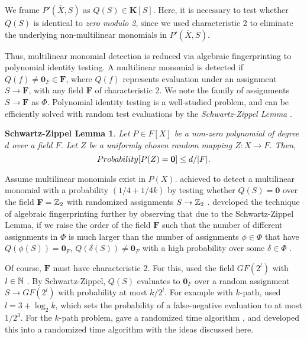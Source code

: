 \begin{problem}
\end{problem}

We frame $P'(\overbar{X}, S)$ as $Q(S) \in \mathbf{K}[S]$. 
Here, it is necessary to test whether $Q(S)$ is identical to \emph{zero modulo 2}, 
since we used characteristic 2 to eliminate 
the underlying non-multilinear monomials in $P'(\overbar{X}, S)$.

Thus, multilinear monomial detection is reduced via algebraic fingerprinting 
to polynomial identity testing. A multilinear monomial is detected if 
$Q(f) \neq \mathbf{0}_F \in \mathbf{F}$, where $Q(f)$ 
represents evaluation under an assignment $S \to \mathbf{F}$, 
with any field $\mathbf{F}$ of characteristic 2. 
We note the family of assignments $S \to \mathbf{F}$ as $\Phi$. 
Polynomial identity testing is a well-studied problem, and can be efficiently 
solved with random test evaluations by the \emph{Schwartz-Zippel Lemma} \cite{Saxena09}.

\newtheorem*{lemmaSZ}{Schwartz-Zippel Lemma}
\begin{lemmaSZ}
  Let $P \in F[X]$ be a non-zero polynomial of degree $d$ over a field $F$. 
  Let $Z$ be a uniformly chosen random mapping $Z \colon X \to F$. Then, 
  \[
    Probability[P(Z) = \mathbf{0}] \leq d/{{\left\vert F\right\vert}}.  
  \]
\end{lemmaSZ}

Assume multilinear monomials exist in $P(X)$. 
\citeauthor{Koutis08} achieved to detect a multilinear monomial 
with a probability $(1/4 + 1/{4k})$ by testing whether 
$Q(S) = \mathbf{0}$ over the field $\mathbf{F} = \mathbb Z_2$  
with randomized assignments $S \to \mathbb Z_2$ \cite{Koutis08}. 
\citeauthor{Williams09} developed the technique of algebraic fingerprinting 
further by observing that due to the Schwartz-Zippel Lemma, %
if we raise the order of the field $\mathbf{F}$ 
such that the number of different assignments in $\Phi$ is much larger than 
the number of assignments $\phi \in \Phi$ that have $Q(\phi(S)) = \mathbf{0}_F$, 
$Q(\delta(S)) \neq \mathbf{0}_F$ with a high probability over some $\delta \in \Phi$ 
\cite{Williams09}. 

Of course, $\mathbf{F}$ must have characteristic 2. For this, \citeauthor{Williams09} 
used the field $GF(2^{l})$ with $l \in \mathbb N$ \cite{Williams09}. By Schwartz-Zippel, $Q(S)$ 
evaluates to $\mathbf{0}_F$ over a random assignment $S \to GF(2^{l})$ with probability 
at most $k/{2^l}$. For example with $k$-path, 
\citeauthor{Williams09} used $l = 3 + \log_2k$, 
which sets the probability of a false-negative evaluation 
to at most $1/2^3$. 
For the $k$-path problem, \citeauthor{Koutis08} 
gave a randomized  time algorithm \cite{Koutis08}, 
and \citeauthor{Williams09} developed this into a randomized  
time algorithm \cite{Williams09} with the ideas discussed here.

